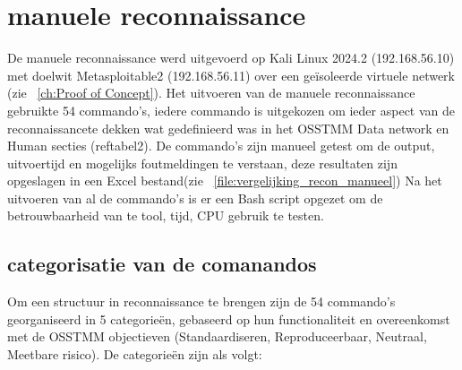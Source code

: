 \section{manuele reconnaissance}
De manuele reconnaissance werd uitgevoerd op Kali Linux 2024.2 (192.168.56.10) met doelwit Metasploitable2 (192.168.56.11) over een geïsoleerde virtuele netwerk (zie ~\ref{ch:Proof of Concept}).
Het uitvoeren van de manuele reconnaissance gebruikte 54 commando's, iedere commando is uitgekozen om ieder aspect van de reconnaissancete dekken wat gedefinieerd was in het OSSTMM Data network en Human secties (ref{tabel2}).
De commando's zijn manueel getest om de output, uitvoertijd en mogelijks foutmeldingen te verstaan, deze resultaten zijn opgeslagen in een Excel bestand(zie ~\ref{file:vergelijking_recon_manueel})
Na het uitvoeren van al de commando's is er een Bash script opgezet om de betrouwbaarheid van te tool, tijd, CPU gebruik te testen.

\subsection{categorisatie van de comanandos}

Om een structuur in reconnaissance te brengen zijn de 54 commando's georganiseerd in 5 categorieën, gebaseerd op hun functionaliteit en overeenkomst met de OSSTMM objectieven (Standaardiseren, Reproduceerbaar, Neutraal, Meetbare risico).
De categorieën zijn als volgt:

